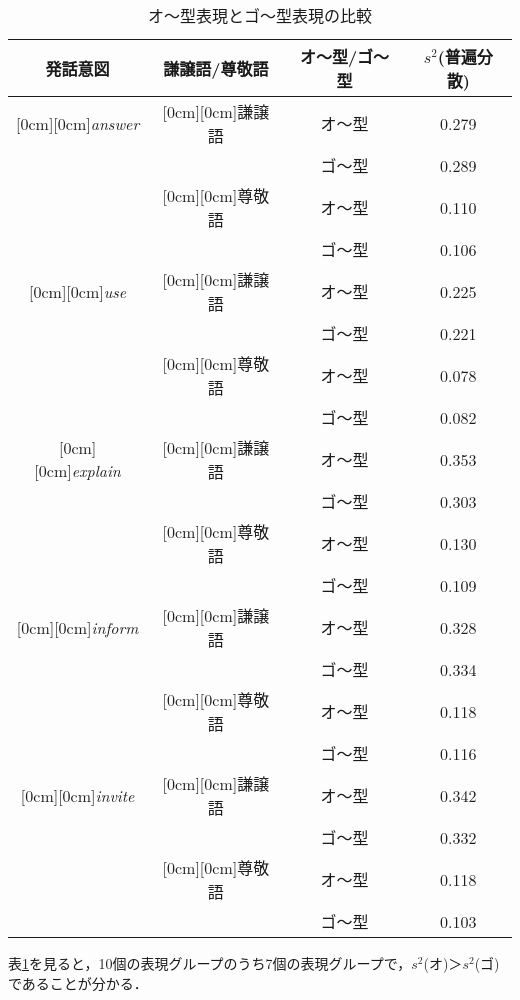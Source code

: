 \begin{table}[htbp]
\begin{center} 
\caption{オ〜型表現とゴ〜型表現の比較} 
\label{tbl:table7} 
\begin{tabular}{|c|c|c|c|}
\hline 
発話意図 & 謙譲語/尊敬語 &  オ〜型/ゴ〜型 & $s^{2}$(普遍分散) \\
\hline
\raisebox{-2zh}[0cm][0cm]{\it answer}	& \raisebox{-.5zh}[0cm][0cm]{謙譲語} & オ〜型 & 0.279 \\
\cline{3-4}
	&	 & ゴ〜型 & 0.289 \\
\cline{2-4}
	& \raisebox{-.5zh}[0cm][0cm]{尊敬語} & オ〜型 & 0.110 \\
\cline{3-4}
	&	 & ゴ〜型 & 0.106 \\
\hline
\raisebox{-2zh}[0cm][0cm]{\it use}	& \raisebox{-.5zh}[0cm][0cm]{謙譲語} & オ〜型 & 0.225 \\
\cline{3-4}
	&	 & ゴ〜型 & 0.221 \\
\cline{2-4}
	& \raisebox{-.5zh}[0cm][0cm]{尊敬語} & オ〜型 & 0.078 \\
\cline{3-4}
	&	 & ゴ〜型 & 0.082 \\
\hline
\raisebox{-2zh}[0cm][0cm]{\it explain}	& \raisebox{-.5zh}[0cm][0cm]{謙譲語} & オ〜型 & 0.353 \\
\cline{3-4}
	&	 & ゴ〜型 & 0.303 \\
\cline{2-4}
	& \raisebox{-.5zh}[0cm][0cm]{尊敬語} & オ〜型 & 0.130 \\
\cline{3-4}
	&	 & ゴ〜型 & 0.109 \\
\hline
\raisebox{-2zh}[0cm][0cm]{\it inform}	& \raisebox{-.5zh}[0cm][0cm]{謙譲語} & オ〜型 & 0.328 \\
\cline{3-4}
	&	 & ゴ〜型 & 0.334 \\
\cline{2-4}
	& \raisebox{-.5zh}[0cm][0cm]{尊敬語} & オ〜型 & 0.118 \\
\cline{3-4}
	&	 & ゴ〜型 & 0.116 \\
\hline
\raisebox{-2zh}[0cm][0cm]{\it invite}	& \raisebox{-.5zh}[0cm][0cm]{謙譲語} & オ〜型 & 0.342 \\
\cline{3-4}
	&	 & ゴ〜型 & 0.332 \\
\cline{2-4}
	& \raisebox{-.5zh}[0cm][0cm]{尊敬語} & オ〜型 & 0.118 \\
\cline{3-4}
	&	 & ゴ〜型 & 0.103 \\
\hline
\end{tabular} 
\end{center} 
\end{table} 

表\ref{tbl:table7}を見ると，10個の表現グループのうち7個の表現グループで，$s^{2}$(オ)＞$s^{2}$(ゴ)であることが分かる．

